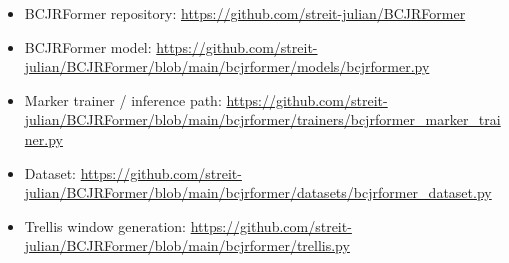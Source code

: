 \documentclass[11pt,a4paper]{article}
\begin{document}
\begin{itemize}
    \item BCJRFormer repository:
    \url{https://github.com/streit-julian/BCJRFormer}
    \item BCJRFormer model:
    \url{https://github.com/streit-julian/BCJRFormer/blob/main/bcjrformer/models/bcjrformer.py}
    \item Marker trainer / inference path:
    \url{https://github.com/streit-julian/BCJRFormer/blob/main/bcjrformer/trainers/bcjrformer_marker_trainer.py}
    \item Dataset:
    \url{https://github.com/streit-julian/BCJRFormer/blob/main/bcjrformer/datasets/bcjrformer_dataset.py}
    \item Trellis window generation:
    \url{https://github.com/streit-julian/BCJRFormer/blob/main/bcjrformer/trellis.py}
\end{itemize}
\end{document}
